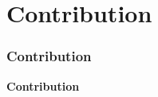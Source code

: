 \documentclass[]{beamer}
\begin{document}
    \section{Contribution}
    \begin{frame}
        \frametitle{Contribution}
        \begin{center}
            \textcolor{elcon-clr!80!black}{\textbf{Contribution}}
        \end{center}
    \end{frame}

\end{document}
